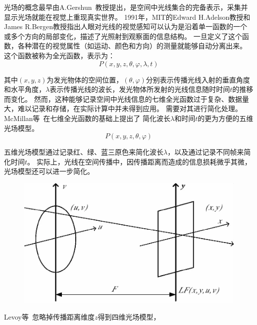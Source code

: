 
\label{chap:part2}


光场的概念最早由A.Gershun~\cite{gershun1939light}教授提出，是空间中光线集合的完备表示，采集并显示光场就能在视觉上重现真实世界。
1991年，MIT的Edward H.Adelson教授和James R.Bergen\cite{adelson1991plenoptic}教授指出人眼对光线的视觉感知可以认为是沿着单一函数的一个或多个方向的局部变化，描述了光照射到观察面的信息结构。
一旦定义了这个函数，各种潜在的视觉属性（如运动、颜色和方向）的测量就能够自动分离出来。
这个函数被称为全光函数，表示为：
\begin{equation}
	P(x,y,z,\theta,\varphi,\lambda,t)
\end{equation}\par
其中$(x,y,z)$为发光物体的空间位置，$(\theta,\varphi)$分别表示传播光线入射的垂直角度和水平角度，$\lambda$表示传播光线的波长，发光物体所发射的光线信息随时时间$t$的推移而变化。
然而，这种能够记录空间中光线信息的七维全光函数过于复杂、数据量大，难以记录和存储，在实际计算中并未得到应用。
需要对其进行简化处理。
McMillan等~\cite{mcmillan2023plenoptic}在七维全光函数的基础上提出了
简化波长$\lambda$和时间$t$的更为方便的五维光场模型。
\begin{equation}
	P(x,y,z,\theta,\varphi)
\end{equation}\par
五维光场模型通过记录红、绿、蓝三原色来简化波长$\lambda$，以及通过记录不同帧来简化时间$t$。
实际上，光线在空间传播中，因传播距离而造成的信息损耗微乎其微，光场模型还可以进一步简化。
\begin{figure}[!ht]
	\centering
	\includegraphics[width=0.70\linewidth]{figures/chapter2/double-plane2}
	\label{chapter2_fig1:double_plane}
\end{figure}
Levoy等~\cite{levoy2023light}忽略掉传播距离维度$z$得到四维光场模型，
